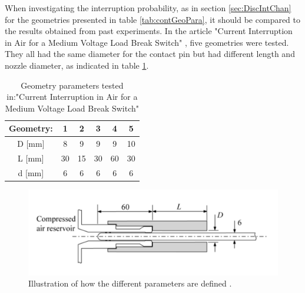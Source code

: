 \documentclass[10pt,a4paper,twoside]{article}
\begin{document}
\makeatletter 
\renewcommand{\thetable}{B.\@arabic\c@table}
\makeatother

When investigating the interruption probability, as in section \ref{sec:DiscIntChan} for the geometries presented in table \ref{tab:contGeoPara}, it should be compared to the results obtained from past experiments. In the article "Current Interruption in Air for a Medium Voltage Load Break Switch" \cite{bib:CIAMVLBS}, five geometries were tested. They all had the same diameter for the contact pin but had different length and nozzle diameter, as indicated in table \ref{tab:contactParaMVALBS}.
\begin{table} [H]
\center
\caption{Geometry parameters tested in:"Current Interruption in Air for a Medium Voltage Load Break Switch"}
\begin{tabular}{|c|c|c|c|c|c|}
\hline 
Geometry: & 1 & 2 & 3 & 4 & 5 \\ 
\hline 
D [mm] & 8 & 9 & 9 & 9 & 10 \\ 
\hline 
L [mm] & 30 & 15 & 30 & 60 & 30 \\ 
\hline 
d [mm] & 6 & 6 & 6 & 6 & 6 \\ 
\hline 
\end{tabular}
\label{tab:contactParaMVALBS}
\end{table}

\begin{figure}[H]
\centering
	\includegraphics[scale=0.6]{Bilder/Discussion/paraDefine.png}
	\caption{Illustration of how the different parameters are defined  \cite{bib:CIAMVLBS}.}
	\label{fig:paraDefMVALBS}
\end{figure}
\end{document}
